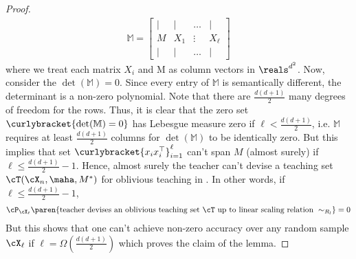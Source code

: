 \begin{proof}
        \begin{align*}
    \mathbb{M} = \begin{bmatrix}
  \Big\lvert & \Big\lvert& \ldots & \Big\lvert \\
  M & X_1 & \vdots & X_\ell\\
  \Big\lvert& \Big\lvert& \ldots & \Big\lvert
\end{bmatrix}
\end{align*}
where we treat each matrix $X_i$ and M as column vectors in $\reals^{d^2}$. Now, consider the $\det(\mathbb{M}) = 0$. Since every entry of $\mathbb{M}$ is semantically different, the determinant is a non-zero polynomial. Note that there are $\frac{d(d+1)}{2}$ many degrees of freedom for the rows. Thus, it is clear that the zero set $\curlybracket{\det(\mathbb{M}) = 0}$ has Lebesgue measure zero if $\ell < \frac{d(d+1)}{2}$, i.e. $\mathbb{M}$ requires at least $\frac{d(d+1)}{2}$ columns for $\det(\mathbb{M})$ to be identically zero. But this implies that set $\curlybracket{x_ix_i^{\top}}_{i=1}^\ell$ can't span $M$ (almost surely) if $\ell \le \frac{d(d+1)}{2} - 1$.
Hence, almost surely the teacher can't devise a teaching set $\cT(\cX_n,\maha, M^*)$ for oblivious teaching in .
In other words, if $\ell \le \frac{d(d+1)}{2} - 1$,
\begin{align*}
    \cP_{\cX_\ell}\paren{ \textnormal{teacher devises} \textnormal{ an oblivious teaching set } \cT \textnormal{ up to linear scaling relation } \sim_{R_l}} = 0
\end{align*}
But this shows that one can't achieve non-zero accuracy over any random sample $\cX_{\ell}$ if $\ell = \Omega(\frac{d(d+1)}{2})$ which proves the claim of the lemma.

\end{proof}

